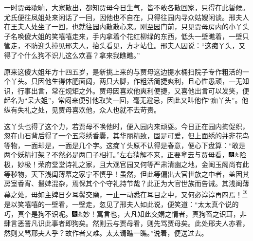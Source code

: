 一时贾母歇晌，大家散出，都知贾母今日生气，皆不敢各散回家，只得在此暂候。尤氏便往凤姐处来闲话了一回，因他也不自在，只得往园内寻众姑嫂闲谈。邢夫人在王夫人处坐了一回，也就往园内散散心来。刚至园门前，只见贾母房内的小丫头子名唤傻大姐的笑嘻嘻走来，手内拿着个花红柳绿的东西，低头一壁瞧着，一壁只管走，不防迎头撞见邢夫人，抬头看见，方才站住。邢夫人因说：``这痴丫头，又得了个什么狗不识儿这么欢喜？拿来我瞧瞧。''

原来这傻大姐年方十四五岁，是新挑上来的与贾母这边提水桶扫院子专作粗活的一个丫头。只因他生得体肥面阔，两只大脚，作粗活简捷爽利，且心性愚顽，一无知识，行事出言，常在规矩之外。贾母因喜欢他爽利便捷，又喜他出言可以发笑，便起名为``呆大姐''，常闷来便引他取笑一回，毫无避忌，因此又叫他作``痴丫头''。他纵有失礼之处，见贾母喜欢他，众人也就不去苛责。

这丫头也得了这个力，若贾母不唤他时，便入园内来顽耍。今日正在园内掏促织，忽在山石背后得了一个五彩绣香囊，其华丽精致，固是可爱，但上面绣的并非花鸟等物，一面却是，一面是几个字。这痴丫头原不认得是春意，便心下盘算：``敢是两个妖精打架？不然必是两口子相打。''左右猜解不来，正要拿去与贾母看，{\includegraphics[width=3mm]{../Images/00004}\includegraphics[width=3mm]{../Images/00012}\footnotesize \kaishu 险极，妙极！荣府堂堂诗礼之家，且大观官园又何等严肃清幽之地，金闺玉阁尚有此等秽物，天下浅闺薄幕之家宁不慎乎！虽然，但此等偏出大官世族之中者，盖因其房室香宵、鬟婢混杂，焉保其个个守礼持节哉？此正为大官世族而告诫。其浅闺薄幕之处，毋如主婢日夕耳鬓交磨，一止一动悉在耳目之中，又何必谆谆再四焉！}\href{../Text/part0077_split_000.html\#lnkback_3_a}{\textsuperscript{③}}是以笑嘻嘻的一壁看，一壁走，忽见了邢夫人如此说，便笑道：``太太真个说的巧，真个是狗不识呢。{\includegraphics[width=3mm]{../Images/00004}\includegraphics[width=3mm]{../Images/00012}\footnotesize \kaishu 妙！寓言也，大凡知此交媾之情者，真狗畜之识耳，非肆言恶詈凡识此事者即狗矣。然则云与贾母看，则先骂贾母矣。此处邢夫人亦看，然则又骂邢夫人乎？故作者又难。}太太请瞧一瞧。''说着，便送过去。

